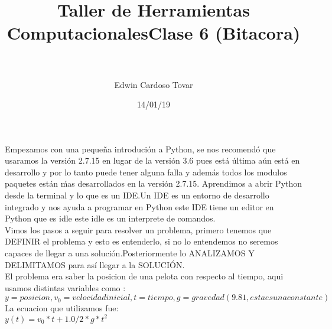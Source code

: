 \documentclass[letterpaper, 12pt, oneside]{article}%
\title{\Huge Taller de Herramientas Computacionales}
\author{Edwin Cardoso Tovar}%
\date{14/01/19}%
\begin{document}
	\maketitle
	\begin{center}%
	\end{center}%
	\newpage%
	
	\title{\textbf{\Huge Clase 6 (Bitacora)\\} \\}%
	
	Empezamos con una pequeña introdución a Python, se nos recomendó que usaramos la versión 2.7.15 en lugar de la versión 3.6 pues está última aún está en desarrollo y por lo tanto puede tener alguna falla y además todos los modulos paquetes están ḿas desarrollados en la versión 2.7.15.
	Aprendimos a abrir Python desde la terminal y lo que es un IDE.Un IDE es un entorno de desarrollo integrado y nos ayuda a programar en Python este IDE tiene un editor en Python que es idle este idle es un interprete de comandos.\\
	
	Vimos los pasos a seguir para resolver un problema, primero tenemos que DEFINIR el problema y esto es entenderlo, si no lo entendemos no seremos capaces de llegar a una solución.Posteriormente lo ANALIZAMOS Y DELIMITAMOS para así llegar  a la SOLUCIÓN.\\
	
	El problema era saber la posicion de una pelota con respecto al tiempo, aqui usamos distintas variables como : $y=posicion,v_{0}=velocidad inicial,t=tiempo,g=gravedad(9.81,esta es una constante)$\\
	La ecuacion que utilizamos fue:\\
	$y(t)=v_{0}*t + 1.0/2*g*t^{2}$
	
	
	
	
	
	
	

	
	
	
	
	
	
	
	
\end{document}
